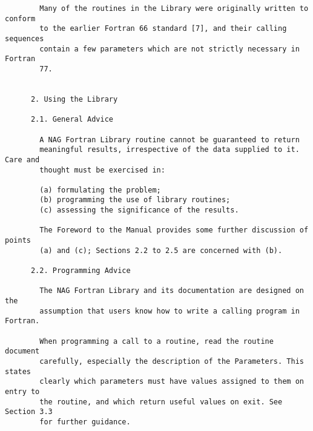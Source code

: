 \begin{small}
\begin{verbatim}
        Many of the routines in the Library were originally written to conform    
        to the earlier Fortran 66 standard [7], and their calling sequences       
        contain a few parameters which are not strictly necessary in Fortran      
        77.                                                                       
                                                                                  
                                                                                  
      2. Using the Library                                                        
                                                                                  
      2.1. General Advice                                                         
                                                                                  
        A NAG Fortran Library routine cannot be guaranteed to return              
        meaningful results, irrespective of the data supplied to it. Care and     
        thought must be exercised in:                                             
                                                                                  
        (a) formulating the problem;                                              
        (b) programming the use of library routines;                              
        (c) assessing the significance of the results.                            
                                                                                  
        The Foreword to the Manual provides some further discussion of points     
        (a) and (c); Sections 2.2 to 2.5 are concerned with (b).                  
                                                                                  
      2.2. Programming Advice                                                     
                                                                                  
        The NAG Fortran Library and its documentation are designed on the         
        assumption that users know how to write a calling program in Fortran.     
                                                                                  
        When programming a call to a routine, read the routine document           
        carefully, especially the description of the Parameters. This states      
        clearly which parameters must have values assigned to them on entry to    
        the routine, and which return useful values on exit. See Section 3.3      
        for further guidance.                                                     
                                                                                  

\end{verbatim}
\end{small}
